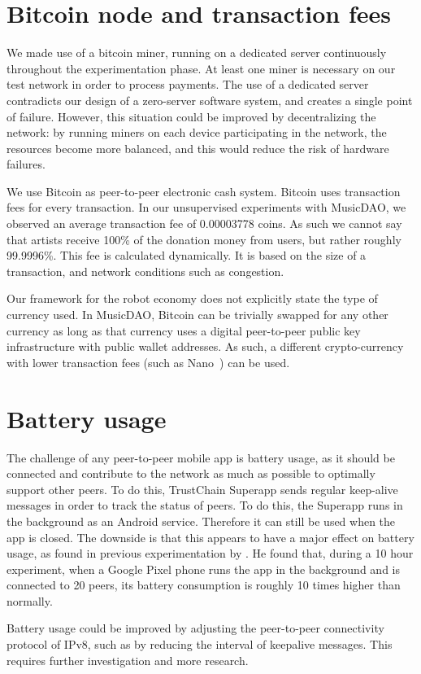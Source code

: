 \section{Bitcoin node and transaction fees}
We made use of a bitcoin miner, running on a dedicated server continuously throughout the experimentation phase. At least one miner is necessary on our test network in order to process payments. The use of a dedicated server contradicts our design of a zero-server software system, and creates a single point of failure. However, this situation could be improved by decentralizing the network: by running miners on each device participating in the network, the resources become more balanced, and this would reduce the risk of hardware failures.

We use Bitcoin as peer-to-peer electronic cash system. Bitcoin uses transaction fees for every transaction. In our unsupervised experiments with MusicDAO, we observed an average transaction fee of 0.00003778 coins. As such we cannot say that artists receive 100\% of the donation money from users, but rather roughly 99.9996\%. This fee is calculated dynamically. It is based on the size of a transaction, and network conditions such as congestion. 

Our framework for the robot economy does not explicitly state the type of currency used. In MusicDAO, Bitcoin can be trivially swapped for any other currency as long as that currency uses a digital peer-to-peer public key infrastructure with public wallet addresses. As such, a different crypto-currency with lower transaction fees (such as Nano~\citep{lemahieu2018nano}) can be used.

\section{Battery usage}
The challenge of any peer-to-peer mobile app is battery usage, as it should be connected and contribute to the network as much as possible to optimally support other peers. To do this, TrustChain Superapp sends regular keep-alive messages in order to track the status of peers. To do this, the Superapp runs in the background as an Android service. Therefore it can still be used when the app is closed. The downside is that this appears to have a major effect on battery usage, as found in previous experimentation by \cite{mattskala2020}. He found that, during a 10 hour experiment, when a Google Pixel phone runs the app in the background and is connected to 20 peers, its battery consumption is roughly 10 times higher than normally. 

Battery usage could be improved by adjusting the peer-to-peer connectivity protocol of IPv8, such as by reducing the interval of keepalive messages. This requires further investigation and more research.

